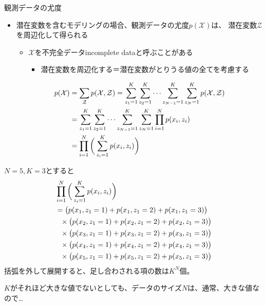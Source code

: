 \documentclass[aspectratio=169,unicode,dvipdfmx,14pt]{beamer}
\begin{document}
\begin{frame}{観測データの尤度}
\vspace{-.05in}
\begin{itemize}
\item 潜在変数を含むモデリングの場合、観測データの尤度$p(\mathcal{X})$は、
潜在変数$\mathcal{Z}$を周辺化して得られる
\begin{itemize}
\item $\mathcal{X}$を不完全データincomplete dataと呼ぶことがある
\begin{itemize}
\item 潜在変数を周辺化する＝潜在変数がとりうる値の全てを考慮する
\end{itemize}
\end{itemize}
\vspace{-.1in}
\begin{align}
p(\mathcal{X}) & = \sum_{\mathcal{Z}} p(\mathcal{X}, \mathcal{Z})
= \sum_{z_1=1}^K \sum_{z_2=1}^K \cdots \sum_{z_{N-1}=1}^K \sum_{z_N=1}^K p(\mathcal{X}, \mathcal{Z})
\notag \\ &
= \sum_{z_1=1}^K \sum_{z_2=1}^K \cdots \sum_{z_{N-1}=1}^K \sum_{z_N=1}^K \prod_{i=1}^N p(x_i, z_i)
\notag \\ &
= \prod_{i=1}^N \bigg( \sum_{z_i=1}^K p(x_i , z_i) \bigg)
\end{align}
\end{itemize}
\end{frame}

\begin{frame}
\FontMath
$N=5, K=3$とすると
\begin{align}
& \prod_{i=1}^N \bigg( \sum_{z_i=1}^K p(x_i , z_i) \bigg)
\notag \\ &
= \big( p(x_1, z_1=1) + p(x_1,z_1=2) + p(x_1,z_1=3) \big)
\notag \\ & \mbox{ \  }
\times \big( p(x_2, z_1=1) + p(x_2,z_1=2) + p(x_2,z_1=3) \big)
\notag \\ & \mbox{ \  }
\times \big( p(x_3, z_1=1) + p(x_3,z_1=2) + p(x_3,z_1=3) \big)
\notag \\ & \mbox{ \  }
\times \big( p(x_4, z_1=1) + p(x_4,z_1=2) + p(x_4,z_1=3) \big)
\notag \\ & \mbox{ \  }
\times \big( p(x_5, z_1=1) + p(x_5,z_1=2) + p(x_5,z_1=3) \big)
\end{align}
括弧を外して展開すると、足し合わされる項の数は$K^N$個。

$K$がそれほど大きな値でないとしても、データのサイズ$N$は、通常、大きな値なので…
\end{frame}
\end{document}
